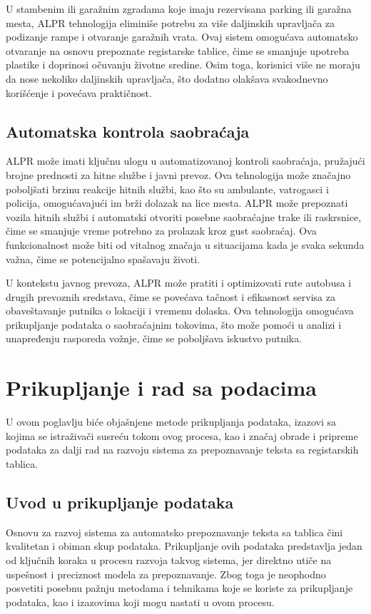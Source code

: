 \documentclass[a4paper,12pt]{article}
\begin{document}
	U stambenim ili garažnim zgradama koje imaju rezervisana parking ili garažna mesta, ALPR tehnologija eliminiše potrebu za više daljinskih upravljača za podizanje rampe i otvaranje garažnih vrata. Ovaj sistem omogućava automatsko otvaranje na osnovu prepoznate registarske tablice, čime se smanjuje upotreba plastike i doprinosi očuvanju životne sredine. Osim toga, korisnici više ne moraju da nose nekoliko daljinskih upravljača, što dodatno olakšava svakodnevno korišćenje i povećava praktičnost.
	
	\subsection{Automatska kontrola saobraćaja}
	ALPR može imati ključnu ulogu u automatizovanoj kontroli saobraćaja, pružajući brojne prednosti za hitne službe i javni prevoz. Ova tehnologija može značajno poboljšati brzinu reakcije hitnih službi, kao što su ambulante, vatrogasci i policija, omogućavajući im brži dolazak na lice mesta. ALPR može prepoznati vozila hitnih službi i automatski otvoriti posebne saobraćajne trake ili raskrsnice, čime se smanjuje vreme potrebno za prolazak kroz gust saobraćaj. Ova funkcionalnost može biti od vitalnog značaja u situacijama kada je svaka sekunda važna, čime se potencijalno spašavaju životi.
	
	U kontekstu javnog prevoza, ALPR može pratiti i optimizovati rute autobusa i drugih prevoznih sredstava, čime se povećava tačnost i efikasnost servisa za obaveštavanje putnika o lokaciji i vremenu dolaska. Ova tehnologija omogućava prikupljanje podataka o saobraćajnim tokovima, što može pomoći u analizi i unapređenju rasporeda vožnje, čime se poboljšava iskustvo putnika.
	\newpage
	
	\section{Prikupljanje i rad sa podacima}
	U ovom poglavlju biće objašnjene metode prikupljanja podataka, izazovi sa kojima se istraživači susreću tokom ovog procesa, kao i značaj obrade i pripreme podataka za dalji rad na razvoju sistema za prepoznavanje teksta sa registarskih tablica.
	
	\subsection{Uvod u prikupljanje podataka}
	Osnovu za razvoj sistema za automatsko prepoznavanje teksta sa tablica čini kvalitetan i obiman skup podataka. Prikupljanje ovih podataka predstavlja jedan od ključnih koraka u procesu razvoja takvog sistema, jer direktno utiče na uspešnost i preciznost modela za prepoznavanje. Zbog toga je neophodno posvetiti posebnu pažnju metodama i tehnikama koje se koriste za prikupljanje podataka, kao i izazovima koji mogu nastati u ovom procesu.
	
\end{document}
